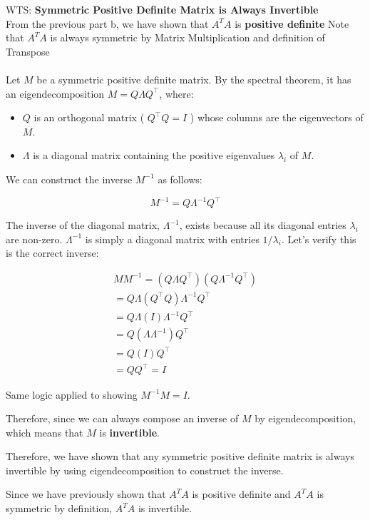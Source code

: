 \begin{enumerate}
    WTS: \textbf{Symmetric Positive Definite Matrix is Always Invertible}\\
    From the previous part b, we have shown that \(A^TA\) is \textbf{positive definite}
    Note that \(A^TA\) is always symmetric by Matrix Multiplication and definition of Transpose\\
    \\
    Let $M$ be a symmetric positive definite matrix. By the spectral theorem, it has an eigendecomposition $M=Q \Lambda Q^{\top}$, where:
    \begin{itemize}
        \item $Q$ is an orthogonal matrix ( $Q^{\top} Q=I$ ) whose columns are the eigenvectors of $M$.
        \item $\Lambda$ is a diagonal matrix containing the positive eigenvalues $\lambda_i$ of $M$.
    \end{itemize}

    We can construct the inverse $M^{-1}$ as follows:

    $$
    M^{-1}=Q \Lambda^{-1} Q^{\top}
    $$


    The inverse of the diagonal matrix, $\Lambda^{-1}$, exists because all its diagonal entries $\lambda_i$ are non-zero. $\Lambda^{-1}$ is simply a diagonal matrix with entries $1 / \lambda_i$.
    Let's verify this is the correct inverse:

    $$
        \begin{gathered}
        M M^{-1}=\left(Q \Lambda Q^{\top}\right)\left(Q \Lambda^{-1} Q^{\top}\right) \\
        =Q \Lambda\left(Q^{\top} Q\right) \Lambda^{-1} Q^{\top} \\
        =Q \Lambda(I) \Lambda^{-1} Q^{\top} \\
        =Q\left(\Lambda \Lambda^{-1}\right) Q^{\top} \\
        =Q(I) Q^{\top} \\
        =Q Q^{\top}=I
        \end{gathered}
    $$
    
    Same logic applied to showing \(M^{-1}M = I\). 
    
    Therefore, since we can always compose an inverse of \(M\) by eigendecomposition, which means that \(M\) is \textbf{invertible}.
    
    Therefore, we have shown that any symmetric positive definite matrix is always invertible by using eigendecomposition to construct the inverse.
    
    Since we have previously shown that \(A^TA\) is positive definite and \(A^TA\) is symmetric by definition, \(A^TA\) is invertible.
    
\end{enumerate}
